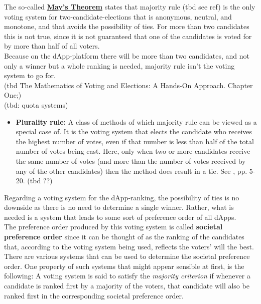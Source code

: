 \noindent The so-called 
\href{https://en.wikipedia.org/wiki/May%27s_theorem}{\textbf{May's Theorem}} 
states that majority rule (tbd see ref)
is the only voting system for two-candidate-elections that is anonymous, neutral, and monotone, and that avoids the possibility of ties. For more than two candidates this is not true, since it is not guaranteed that one of the candidates is voted for by more than half of all voters. \\
Because on the dApp-platform there will be more than two candidates, and not only a winner but a whole ranking is needed, majority rule isn't the voting system to go for.\\

(tbd \cite{Handsonapproach} The Mathematics of Voting and Elections: A Hands-On Approach. Chapter One;)\\
(tbd: quota systems)\\

\begin{itemize}[leftmargin = 0pt, nosep]
\item {\textbf{Plurality rule:}} A class of methods of which majority rule can be viewed as a special case of. It is the voting system that elects the candidate who receives the highest number of votes, even if that number is less than half of the total number of votes being cast. Here, only when two or more candidates receive the same number of votes (and more than the number of votes received by any of the other candidates) then the method does result in a tie. See \cite{voting}, pp. 5-20. (tbd ??) 
\end{itemize}
\noindent Regarding a voting system for the dApp-ranking, the possibility of ties is no downside as there is no need to determine a single winner. Rather, what is needed is a system that leads to some sort of preference order of all dApps. \\

\noindent The preference order produced by this voting system is called {\textbf{societal preference order}} since it can be thought of as the ranking of the candidates that, according to the voting system being used, reflects the voters' will the best.
There are various systems that can be used to determine the societal preference order. One property of such systems that might appear sensible at first, is the following: A voting system is said to satisfy the {\textit{majority criterion}} if whenever a candidate is ranked first by a majority of the voters, that candidate will also be ranked first in the corresponding societal preference order. \\

